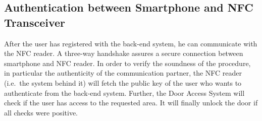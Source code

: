 \subsection{Authentication between Smartphone and NFC Transceiver}
After the user has registered with the back-end system, he can communicate with the NFC reader. 
A three-way handshake assures a secure connection between smartphone and NFC reader.
In order to verify the soundness of the procedure, in particular the authenticity of the communication partner, the NFC reader (i.e.~the system behind it) will fetch the public key of the user who wants to authenticate from the back-end system.
Further, the Door Access System will check if the user has access to the requested area.
It will finally unlock the door if all checks were positive.
